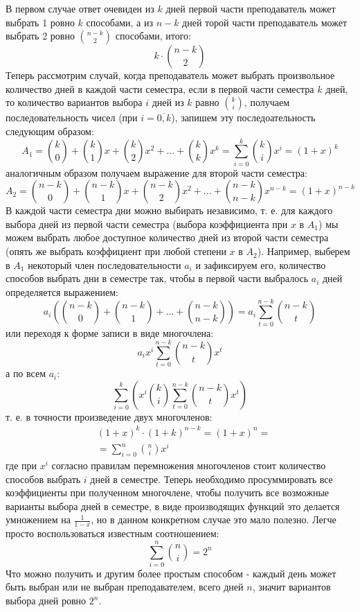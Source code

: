\documentclass[a4paper,12pt]{article}
\begin{document}
\begin{Solution}
В первом случае ответ очевиден из $k$ дней первой части преподаватель может выбрать 1 ровно $k$ способами, а из $n-k$ дней торой части преподаватель может выбрать 2 ровно $\binom{n-k}{2}$ способами, итого:
\[
	k \cdot \binom{n-k}{2}
\]
Теперь рассмотрим случай, когда преподаватель может выбрать произвольное количество дней в каждой части семестра, если в первой части семестра $k$ дней, то количество вариантов выбора $i$ дней из $k$ равно $\binom{k}{i}$, получаем последовательность чисел (при $i = \overline{0,k}$), запишем эту последоательность следующим образом:
\[
	A_1 = \binom{k}{0} + \binom{k}{1}x + \binom{k}{2}x^2 + ... + \binom{k}{k} x^k = \sum_{i=0}^{k} \binom{k}{i}x^i = {\left(1+x\right)}^k
\]
аналогичным образом получаем выражение для второй части семестра:
\[
	A_2 = \binom{n-k}{0} + \binom{n-k}{1}x + \binom{n-k}{2}x^2 + ... + \binom{n-k}{n-k} x^{n-k} = {\left(1+x\right)}^{n-k}
\]
В каждой части семестра дни можно выбирать независимо, т. е. для каждого выбора дней из первой части семестра (выбора коэффициента при $x$ в $A_1$) мы можем выбрать любое доступное количество дней из второй части семестра (опять же выбрать коэффициент при любой степени $x$ в $A_2$). Например, выберем в $A_1$ некоторый член последовательности $a_i$ и зафиксируем его, количество способов выбрать дни в семестре так, чтобы в первой части выбралось $a_i$ дней определяется выражением:
\[
	a_i \left(\binom{n-k}{0} + \binom{n-k}{1} + ... + \binom{n-k}{n-k}\right) = a_i \sum_{t=0}^{n-k} \binom{n-k}{t}
\]
или переходя к форме записи в виде многочлена:
\[
	a_i x^i \sum_{t=0}^{n-k} \binom{n-k}{t} x^t
\]
а по всем $a_i$:
\[
	\sum_{i=0}^k \left(x^i \binom{k}{i} \sum_{t=0}^{n-k} \binom{n-k}{t} x^t\right)
\]
т. е. в точности произведение двух многочленов:
\[
	\begin{split}
		& {\left(1+x\right)}^k \cdot {\left(1+k\right)}^{n-k} = {\left(1+x\right)}^n = \\
		& = \sum_{i=0}^n \binom{n}{i} x^i
	\end{split}
\]
где при $x^i$ согласно правилам перемножения многочленов стоит количество способов выбрать $i$ дней в семестре. Теперь необходимо просуммировать все коэффициенты при полученном многочлене, чтобы получить все возможные варианты выбора дней в семестре, в виде производящих функций это делается умножением на $\frac{1}{1-x}$, но в данном конкретном случае это мало полезно. Легче просто воспользоваться известным соотношением:
\[
	\sum_{i=0}^n \binom{n}{i} = 2^n
\]
Что можно получить и другим более простым способом - каждый день может быть выбран или не выбран преподавателем, всего дней $n$, значит вариантов выбора дней ровно $2^n$.
\end{Solution}
\end{document}
